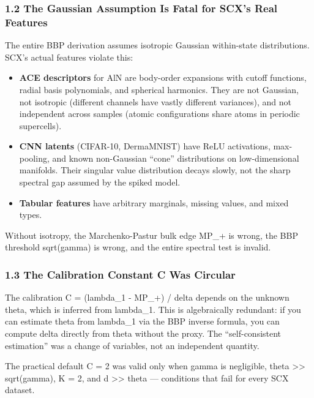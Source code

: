 \documentclass[
  12pt,
]{article}
\providecommand{\tightlist}{%
  \setlength{\itemsep}{0pt}\setlength{\parskip}{0pt}}
\begin{document}
\subsubsection{1.2 The Gaussian Assumption Is Fatal for SCX's Real
Features}\label{the-gaussian-assumption-is-fatal-for-scxs-real-features}

The entire BBP derivation assumes isotropic Gaussian within-state
distributions. SCX's actual features violate this:

\begin{itemize}
\tightlist
\item
  \textbf{ACE descriptors} for AlN are body-order expansions with cutoff
  functions, radial basis polynomials, and spherical harmonics. They are
  not Gaussian, not isotropic (different channels have vastly different
  variances), and not independent across samples (atomic configurations
  share atoms in periodic supercells).
\item
  \textbf{CNN latents} (CIFAR-10, DermaMNIST) have ReLU activations,
  max-pooling, and known non-Gaussian ``cone'' distributions on
  low-dimensional manifolds. Their singular value distribution decays
  slowly, not the sharp spectral gap assumed by the spiked model.
\item
  \textbf{Tabular features} have arbitrary marginals, missing values,
  and mixed types.
\end{itemize}

Without isotropy, the Marchenko-Pastur bulk edge MP\_+ is wrong, the BBP
threshold sqrt(gamma) is wrong, and the entire spectral test is invalid.

\subsubsection{1.3 The Calibration Constant C Was
Circular}\label{the-calibration-constant-c-was-circular}

The calibration C = (lambda\_1 - MP\_+) / delta depends on the unknown
theta, which is inferred from lambda\_1. This is algebraically
redundant: if you can estimate theta from lambda\_1 via the BBP inverse
formula, you can compute delta directly from theta without the proxy.
The ``self-consistent estimation'' was a change of variables, not an
independent quantity.

The practical default C = 2 was valid only when gamma is negligible,
theta \textgreater\textgreater{} sqrt(gamma), K = 2, and d
\textgreater\textgreater{} theta --- conditions that fail for every SCX
dataset.
\end{document}

